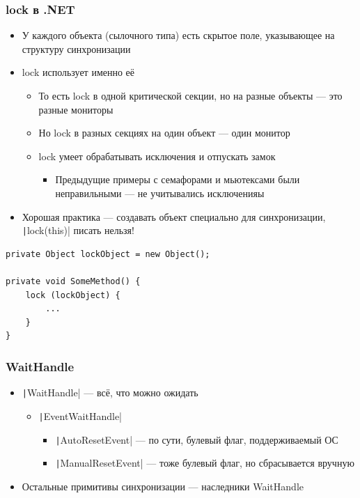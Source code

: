 \documentclass[xetex,mathserif,serif]{beamer}
\begin{document}
	\begin{frame}[fragile]
		\frametitle{lock в .NET}
		\begin{itemize}
			\item У каждого объекта (сылочного типа) есть скрытое поле, указывающее на структуру синхронизации
			\item lock использует именно её
			\begin{itemize}
				\item То есть lock в одной критической секции, но на разные объекты --- это разные мониторы
				\item Но lock в разных секциях на один объект --- один монитор
				\item lock умеет обрабатывать исключения и отпускать замок
				\begin{itemize}
					\item Предыдущие примеры с семафорами и мьютексами были неправильными --- не учитывались исключенияы
				\end{itemize}
			\end{itemize}
			\item Хорошая практика --- создавать объект специально для синхронизации, \texttt|lock(this)| писать нельзя!
		\end{itemize}
		\begin{footnotesize}
			\begin{verbatim}
private Object lockObject = new Object();

private void SomeMethod() {
    lock (lockObject) {
        ...
    }
}
			\end{verbatim}
		\end{footnotesize}
	\end{frame}

	\begin{frame}
		\frametitle{WaitHandle}
		\begin{itemize}
			\item \texttt|WaitHandle| --- всё, что можно ожидать
			\begin{itemize}
				\item \texttt|EventWaitHandle|
				\begin{itemize}
					\item \texttt|AutoResetEvent| --- по сути, булевый флаг, поддерживаемый ОС
					\item \texttt|ManualResetEvent| --- тоже булевый флаг, но сбрасывается вручную
				\end{itemize}
			\end{itemize}
			\item Остальные примитивы синхронизации --- наследники WaitHandle
		\end{itemize}
	\end{frame}
\end{document}
